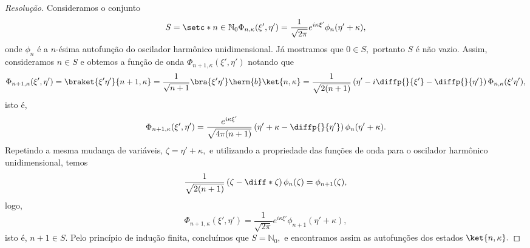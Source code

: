 \begin{proof}[Resolução]
   Consideramos o conjunto
   \begin{equation*}
      S = \setc*{n \in \mathbb{N}_0}{\Phi_{n, \kappa}(\xi', \eta') = \frac1{\sqrt{2\pi}} e^{i \kappa \xi'} \phi_n(\eta' + \kappa)},
   \end{equation*}
   onde \(\phi_n\) é a \(n\)-ésima autofunção do oscilador harmônico unidimensional. Já mostramos que \(0 \in S,\) portanto \(S\) é não vazio. Assim, consideramos \(n \in S\) e obtemos a função de onda \(\Phi_{n+1,\kappa}(\xi', \eta')\) notando que
   \begin{equation*}
      \Phi_{n+1,\kappa}(\xi', \eta') = \braket{\xi'\eta'}{n+1,\kappa} = \frac{1}{\sqrt{n+1}} \bra{\xi'\eta'} \herm{b}\ket{n,\kappa} = \frac{1}{\sqrt{2(n+1)}} \left(\eta' - i \diffp{}{\xi'} - \diffp{}{\eta'}\right)\Phi_{n,\kappa}(\xi'\eta'),
   \end{equation*}
   isto é,
   \begin{equation*}
      \Phi_{n+1,\kappa}(\xi', \eta') = \frac{e^{i\kappa \xi'}}{\sqrt{4\pi(n+1)}} \left(\eta' + \kappa - \diffp{}{\eta'}\right)\phi_n(\eta' + \kappa).
   \end{equation*}
   Repetindo a mesma mudança de variáveis, \(\zeta = \eta' + \kappa,\) e utilizando a propriedade das funções de onda para o oscilador harmônico unidimensional, temos
   \begin{equation*}
      \frac{1}{\sqrt{2(n+1)}} \left(\zeta - \diff*{}{\zeta}\right)\phi_n(\zeta) = \phi_{n+1}(\zeta),
   \end{equation*}
   logo,
   \begin{equation*}
      \Phi_{n+1,\kappa}(\xi', \eta') = \frac{1}{\sqrt{2\pi}} e^{i \kappa \xi'} \phi_{n+1}(\eta' + \kappa),
   \end{equation*}
   isto é, \(n + 1 \in S.\) Pelo princípio de indução finita, concluímos que \(S = \mathbb{N}_0,\) e encontramos assim as autofunções dos estados \(\ket{n,\kappa}.\)


\end{proof}
